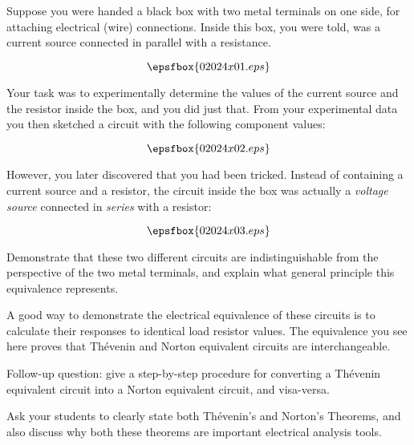 

Suppose you were handed a black box with two metal terminals on one side, for attaching electrical (wire) connections.  Inside this box, you were told, was a current source connected in parallel with a resistance.

$$\epsfbox{02024x01.eps}$$

Your task was to experimentally determine the values of the current source and the resistor inside the box, and you did just that.  From your experimental data you then sketched a circuit with the following component values:

$$\epsfbox{02024x02.eps}$$

However, you later discovered that you had been tricked.  Instead of containing a current source and a resistor, the circuit inside the box was actually a {\it voltage source} connected in {\it series} with a resistor:

$$\epsfbox{02024x03.eps}$$

Demonstrate that these two different circuits are indistinguishable from the perspective of the two metal terminals, and explain what general principle this equivalence represents.







A good way to demonstrate the electrical equivalence of these circuits is to calculate their responses to identical load resistor values.  The equivalence you see here proves that Th\'evenin and Norton equivalent circuits are interchangeable.

\vskip 10pt

Follow-up question: give a step-by-step procedure for converting a Th\'evenin equivalent circuit into a Norton equivalent circuit, and visa-versa.







Ask your students to clearly state both Th\'evenin's and Norton's Theorems, and also discuss why both these theorems are important electrical analysis tools.




